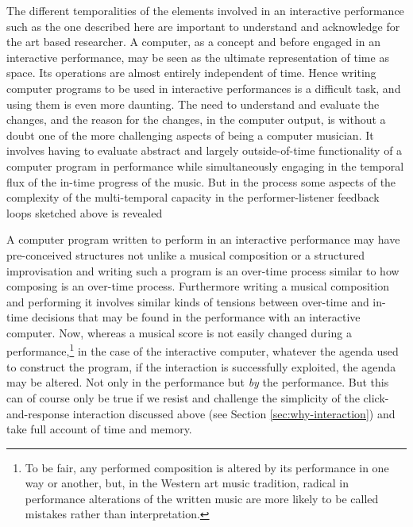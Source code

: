 The different temporalities of the elements involved in an interactive performance such as the one described here are important to understand and acknowledge for the art based researcher. A computer, as a concept and before engaged in an interactive performance, may be seen as the ultimate representation of time as space. Its operations are almost entirely independent of time. Hence writing computer programs to be used in interactive performances is a difficult task, and using them is even more daunting. The need to understand and evaluate the changes, and the reason for the changes, in the computer output, is without a doubt one of the more challenging aspects of being a computer musician. It involves having to evaluate abstract and largely outside-of-time functionality of a computer program in performance while simultaneously engaging in the temporal flux of the in-time progress of the music. But in the process some aspects of the complexity of the multi-temporal capacity in the performer-listener feedback loops sketched above is revealed

A computer program written to perform in an interactive performance may have pre-conceived structures not unlike a musical composition or a structured improvisation and writing such a program is an over-time process similar to how composing is an over-time process. Furthermore writing a musical composition and performing it involves similar kinds of tensions between over-time and in-time decisions that may be found in the performance with an interactive computer. Now, whereas a musical score is not easily changed during a performance,\footnote{To be fair, any performed composition is altered by its performance in one way or another, but, in the Western art music tradition, radical in performance alterations of the written music are more likely to be called mistakes rather than interpretation.} in the case of the interactive computer, whatever the agenda used to construct the program, if the interaction is successfully exploited, the agenda may be altered. Not only in the performance but \emph{by} the performance. But this can of course only be true if we resist and challenge the simplicity of the click-and-response interaction discussed above (see Section \ref{sec:why-interaction}) and take full account of time and memory.

